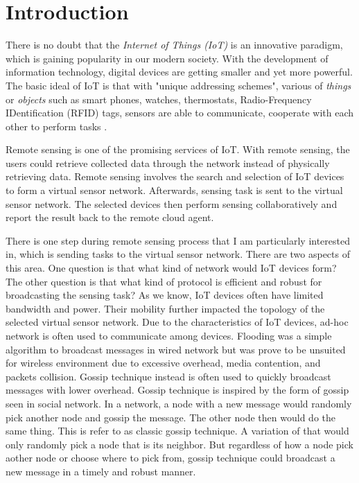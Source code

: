 \chapter{Introduction}

There is no doubt that the \emph{Internet of Things (IoT)} is an innovative paradigm, \cite{Atzori} which is gaining popularity in our modern society.  With the development of information technology, digital devices are getting smaller and yet more powerful. The basic ideal of IoT is that with "unique addressing schemes", various of \emph{things} or \emph{objects} such as smart phones, watches, thermostats, Radio-Frequency IDentification (RFID) tags, sensors are able to communicate, cooperate with each other to perform tasks \cite{Atzori}.  

Remote sensing is one of the promising services of IoT. With remote sensing, the users could retrieve collected data through the network instead of physically retrieving data. Remote sensing involves the search and selection of IoT devices to form a virtual sensor network. Afterwards, sensing task is sent to the virtual sensor network. The selected devices then perform sensing collaboratively and report the result back to the remote cloud agent. 

There is one step during remote sensing process that I am particularly interested in, which is sending tasks to the virtual sensor network. There are two aspects of this area. One question is that what kind of network would IoT devices form? The other question is that what kind of protocol is efficient and robust for broadcasting the sensing task? As we know, IoT devices often have limited bandwidth and power. Their mobility further impacted the topology of the selected virtual sensor network. Due to the characteristics of IoT devices, ad-hoc network is often used to communicate among devices. Flooding was a simple algorithm to broadcast messages in wired network but was prove to be unsuited for wireless environment due to excessive overhead, media contention, and packets collision. Gossip technique instead is often used to quickly broadcast messages with lower overhead. Gossip technique is inspired by the form of gossip seen in social network. In a network, a node with a new message would randomly pick another node and gossip the message. The other node then would do the same thing. This is refer to as classic gossip technique. A variation of that would only randomly pick a node that is its neighbor. But regardless of how a node pick aother node or choose where to pick from, gossip technique could broadcast a new message in a timely and robust manner.

